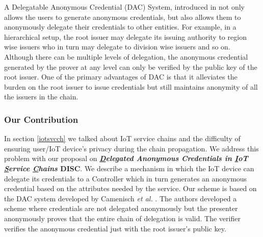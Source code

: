 \documentclass[journal]{IEEEtran}
\begin{document}
A Delegatable Anonymous Credential (DAC) System, introduced in \cite{delegatabledac} not only allows the users to generate anonymous credentials, but also allows them to anonymously delegate their credentials to other entities. For example, in a hierarchical setup, the root issuer may delegate its issuing authority to region wise issuers who in turn may delegate to division wise issuers and so on. Although there can be multiple levels of delegation, the anonymous credential generated by the prover at any level can only be verified by the public key of the root issuer.  One of the primary advantages of DAC is that it alleviates the burden on the root issuer to issue credentials but still maintains anonymity of all the issuers in the chain.

\subsubsection{Our Contribution}
In section \ref{iotsvcch} we talked about IoT service chains and the difficulty of ensuring user/IoT device's privacy during the chain propagation. We address this problem with our proposal on \textbf{\textit{\underline{D}elegated Anonymous Credentials in \underline{I}oT \underline{S}ervice \underline{C}hains} DISC}. We describe a mechanism in which the IoT device can delegate its credentials to a Controller which in turn generates an anonymous credential based on the attributes needed by the service. Our scheme is based on the DAC system developed by Camenisch \textit{et al.} \cite{CamenischDD17}. The authors developed a scheme where credentials are not delegated anonymously but the presenter anonymously proves that the entire chain of delegation is valid. The verifier verifies the anonymous credential just with the root issuer's public key.
\end{document}

